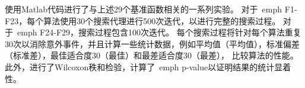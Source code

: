 使用Matlab代码进行了与上述29个基准函数相关的一系列实验。 对于\ emph {F1-F23}，每个算法使用30个搜索代理进行500次迭代，以进行完整的搜索过程。 对于\ emph {F24-F29}，搜索过程包含100次迭代。 每个搜索过程将针对每个算法重复30次以消除意外事件，并且计算一些统计数据，例如平均值（平均值），标准偏差（标准差），最佳适合度30（最佳）和最差适合度30（最差）， 比较算法的性能。 此外，进行了Wilcoxon秩和检验，计算了\ emph {p-value}以证明结果的统计显着性。

